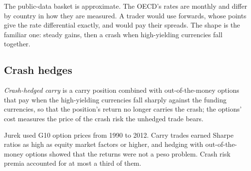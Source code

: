 \begin{omfigure}

\label{fig:s2:cross-currency-basis-and-fx-carry:g10}
\end{omfigure}

The public-data basket is approximate. The OECD's rates are monthly and differ by country in how they are measured. A trader would use forwards, whose
points give the rate differential exactly, and would pay their spreads. The shape is the familiar one: steady gains, then a crash when high-yielding
currencies fall together.

\subsection*{Crash hedges}

\begin{definition}\label{def:s2:cross-currency-basis-and-fx-carry:hedged}
\emph{Crash-hedged carry} is a carry position combined with out-of-the-money options that pay when the high-yielding
currencies fall sharply against the funding currencies, so that the position's return no longer carries the crash; the options' cost measures the
price of the crash risk the unhedged trade bears.
\end{definition}

Jurek used G10 option prices from 1990 to 2012. Carry trades earned Sharpe ratios as high as equity market factors or higher, and hedging with
out-of-the-money options showed that the returns were not a peso problem. Crash risk premia accounted for at most a third of them.

